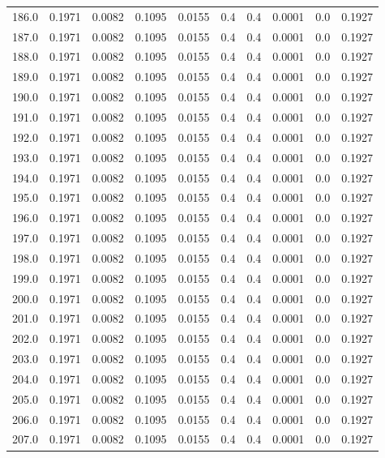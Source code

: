 \begin{longtable}{lrrrrrrrrr}
186.0 & 0.1971 & 0.0082 & 0.1095 & 0.0155 & 0.4 & 0.4 & 0.0001 & 0.0 & 0.1927 \\
187.0 & 0.1971 & 0.0082 & 0.1095 & 0.0155 & 0.4 & 0.4 & 0.0001 & 0.0 & 0.1927 \\
188.0 & 0.1971 & 0.0082 & 0.1095 & 0.0155 & 0.4 & 0.4 & 0.0001 & 0.0 & 0.1927 \\
189.0 & 0.1971 & 0.0082 & 0.1095 & 0.0155 & 0.4 & 0.4 & 0.0001 & 0.0 & 0.1927 \\
190.0 & 0.1971 & 0.0082 & 0.1095 & 0.0155 & 0.4 & 0.4 & 0.0001 & 0.0 & 0.1927 \\
191.0 & 0.1971 & 0.0082 & 0.1095 & 0.0155 & 0.4 & 0.4 & 0.0001 & 0.0 & 0.1927 \\
192.0 & 0.1971 & 0.0082 & 0.1095 & 0.0155 & 0.4 & 0.4 & 0.0001 & 0.0 & 0.1927 \\
193.0 & 0.1971 & 0.0082 & 0.1095 & 0.0155 & 0.4 & 0.4 & 0.0001 & 0.0 & 0.1927 \\
194.0 & 0.1971 & 0.0082 & 0.1095 & 0.0155 & 0.4 & 0.4 & 0.0001 & 0.0 & 0.1927 \\
195.0 & 0.1971 & 0.0082 & 0.1095 & 0.0155 & 0.4 & 0.4 & 0.0001 & 0.0 & 0.1927 \\
196.0 & 0.1971 & 0.0082 & 0.1095 & 0.0155 & 0.4 & 0.4 & 0.0001 & 0.0 & 0.1927 \\
197.0 & 0.1971 & 0.0082 & 0.1095 & 0.0155 & 0.4 & 0.4 & 0.0001 & 0.0 & 0.1927 \\
198.0 & 0.1971 & 0.0082 & 0.1095 & 0.0155 & 0.4 & 0.4 & 0.0001 & 0.0 & 0.1927 \\
199.0 & 0.1971 & 0.0082 & 0.1095 & 0.0155 & 0.4 & 0.4 & 0.0001 & 0.0 & 0.1927 \\
200.0 & 0.1971 & 0.0082 & 0.1095 & 0.0155 & 0.4 & 0.4 & 0.0001 & 0.0 & 0.1927 \\
201.0 & 0.1971 & 0.0082 & 0.1095 & 0.0155 & 0.4 & 0.4 & 0.0001 & 0.0 & 0.1927 \\
202.0 & 0.1971 & 0.0082 & 0.1095 & 0.0155 & 0.4 & 0.4 & 0.0001 & 0.0 & 0.1927 \\
203.0 & 0.1971 & 0.0082 & 0.1095 & 0.0155 & 0.4 & 0.4 & 0.0001 & 0.0 & 0.1927 \\
204.0 & 0.1971 & 0.0082 & 0.1095 & 0.0155 & 0.4 & 0.4 & 0.0001 & 0.0 & 0.1927 \\
205.0 & 0.1971 & 0.0082 & 0.1095 & 0.0155 & 0.4 & 0.4 & 0.0001 & 0.0 & 0.1927 \\
206.0 & 0.1971 & 0.0082 & 0.1095 & 0.0155 & 0.4 & 0.4 & 0.0001 & 0.0 & 0.1927 \\
207.0 & 0.1971 & 0.0082 & 0.1095 & 0.0155 & 0.4 & 0.4 & 0.0001 & 0.0 & 0.1927 \\

\end{longtable}
